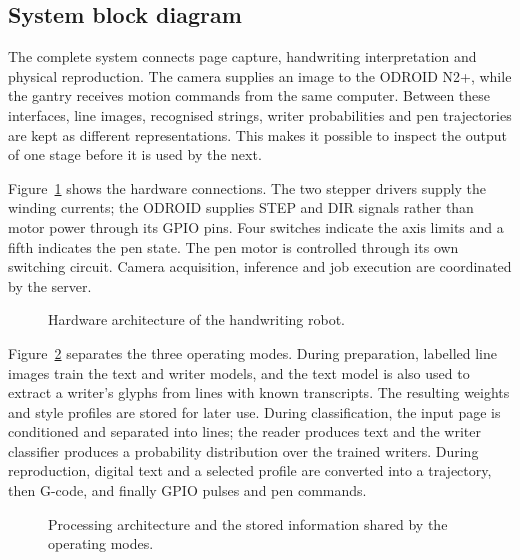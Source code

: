 \subsection{System block diagram}
\label{sec:des-system}
The complete system connects page capture, handwriting interpretation and physical reproduction. The camera supplies an image to the ODROID N2+, while the gantry receives motion commands from the same computer. Between these interfaces, line images, recognised strings, writer probabilities and pen trajectories are kept as different representations. This makes it possible to inspect the output of one stage before it is used by the next.


Figure~\ref{fig:des-hardware-system} shows the hardware connections. The two stepper drivers supply the winding currents; the ODROID supplies STEP and DIR signals rather than motor power through its GPIO pins. Four switches indicate the axis limits and a fifth indicates the pen state. The pen motor is controlled through its own switching circuit. Camera acquisition, inference and job execution are coordinated by the server.


\begin{figure}[!htbp]\centering
{}
\caption{Hardware architecture of the handwriting robot.}
\label{fig:des-hardware-system}
\end{figure}

Figure~\ref{fig:des-processing-system} separates the three operating modes. During preparation, labelled line images train the text and writer models, and the text model is also used to extract a writer's glyphs from lines with known transcripts. The resulting weights and style profiles are stored for later use. During classification, the input page is conditioned and separated into lines; the reader produces text and the writer classifier produces a probability distribution over the trained writers. During reproduction, digital text and a selected profile are converted into a trajectory, then G-code, and finally GPIO pulses and pen commands.


\begin{figure}[!htbp]\centering
{}
\caption{Processing architecture and the stored information shared by the operating modes.}
\label{fig:des-processing-system}
\end{figure}

